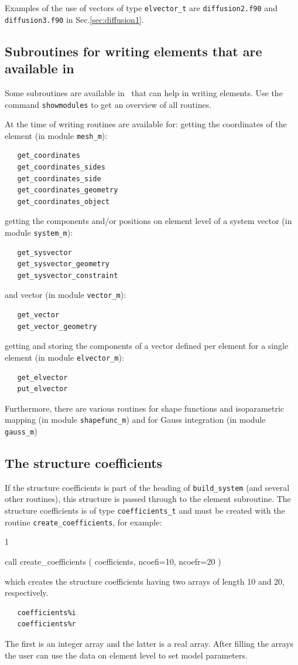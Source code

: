 Examples of the use of vectors of type \texttt{elvector\_t} are 
\texttt{diffusion2.f90} and 
\texttt{diffusion3.f90} in Sec.\ref{sec:diffusion1}.

\subsection{Subroutines for writing elements that are available in \tfem}
\label{sec:elemsub}

Some subroutines are available in \tfem\ that can help in writing elements. Use
the command \texttt{showmodules} to get an overview of all routines.

At the time of writing routines are available for: getting the coordinates
of the element (in module \texttt{mesh\_m}):

\begin{verbatim}
   get_coordinates
   get_coordinates_sides
   get_coordinates_side
   get_coordinates_geometry
   get_coordinates_object
\end{verbatim}
getting the components and/or positions on element level of
a system vector (in module \texttt{system\_m}):

\begin{verbatim}
   get_sysvector
   get_sysvector_geometry
   get_sysvector_constraint
\end{verbatim}
and vector (in module \texttt{vector\_m}):

\begin{verbatim}
   get_vector
   get_vector_geometry
\end{verbatim}
getting and storing the components of a vector defined per element
for a single element (in module \texttt{elvector\_m}):
\begin{verbatim}
   get_elvector
   put_elvector
\end{verbatim}
Furthermore, there are various routines for shape functions and isoparametric
mapping (in module \texttt{shapefunc\_m}) and for Gauss integration (in module
\texttt{gauss\_m})

\subsection{The structure coefficients}
\label{sec:coefficients}

If the structure coefficients is part of the heading of \texttt{build\_system} (and several other routines),
this structure is passed through to the element subroutine. The structure
coefficients is of type \texttt{coefficients\_t} and must be created with 
the routine \texttt{create\_coefficients}, for example:
\begin{listing}{1}
   
   call create_coefficients ( coefficients, ncoefi=10, ncoefr=20 )

\end{listing}
which creates the structure coefficients having two arrays of length 10 and 20,
respectively.
\begin{verbatim}
   coefficients%i
   coefficients%r
\end{verbatim}
The first is an integer array and the latter is a real array. After filling the
arrays the user can use the data on element level to set model parameters.

